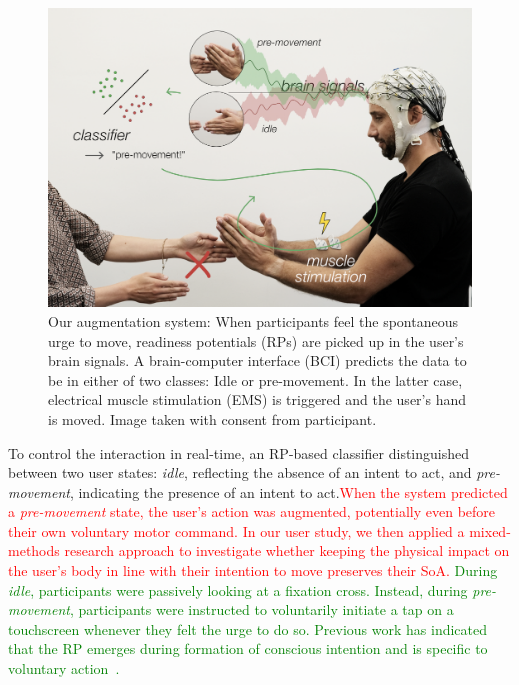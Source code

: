 \begin{figure}[!h]
    \centering
    \includegraphics[width=\columnwidth]{figures/teaser_new.png}%
    \caption{Our augmentation system: When participants feel the spontaneous urge to move, readiness potentials (RPs) are picked up in the user's brain signals. A brain-computer interface (BCI) predicts the data to be in either of two classes: Idle or pre-movement. In the latter case, electrical muscle stimulation (EMS) is triggered and the user's hand is moved. Image taken with consent from participant.}
\end{figure}

To control the interaction in real-time, an RP-based classifier distinguished between two user states: \textit{idle}, reflecting the absence of an intent to act, and \textit{pre-movement}, indicating the presence of an intent to act.\textcolor{red}{When the system predicted a \textit{pre-movement} state, the user's action was augmented, potentially even before their own voluntary motor command. In our user study, we then applied a mixed-methods research approach to investigate whether keeping the physical impact on the user's body in line with their intention to move preserves their SoA.} \textcolor{green}{During \textit{idle}, participants were passively looking at a fixation cross. Instead, during \textit{pre-movement}, participants were instructed to voluntarily initiate a tap on a touchscreen whenever they felt the urge to do so. Previous work has indicated that the RP emerges during formation of conscious intention and is specific to voluntary action~\cite{Schultze-Kraft2020-rm, Travers2020-hf, Pares-Pujolras2019-ll}.}

